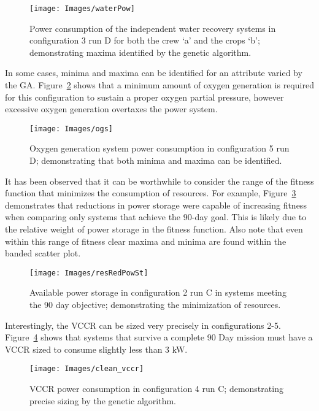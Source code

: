 \documentclass[submit]{aiaa}
\begin{document}
\begin{figure}[htb]
\texttt{[image: Images/waterPow]}
\caption{Power consumption of the independent water recovery systems in configuration 3
  run D for both the crew `a' and the crops `b'; demonstrating maxima identified by the genetic algorithm.}
\label{fig:waterRS}
\end{figure}

In some cases, minima and maxima can be identified for an attribute
varied by the GA. Figure~\ref{fig:ogsminmax} shows that a minimum
amount of oxygen generation is required for this configuration to
sustain a proper oxygen partial pressure, however excessive
oxygen generation overtaxes the power system.

\begin{figure}[htb]
\texttt{[image: Images/ogs]}
\caption{Oxygen generation system power consumption in configuration 5 run D; demonstrating that both minima and maxima can be identified.}
\label{fig:ogsminmax}
\end{figure}

It has been observed that it can be worthwhile to consider the range
of the fitness function that minimizes the consumption of
resources. 
For example, Figure~\ref{fig:resources} demonstrates that reductions in power storage were capable of increasing fitness when comparing only systems that achieve the 90-day goal.
This is likely due to the relative weight of power storage in the fitness function.
Also note that even within this range of fitness clear maxima and minima are found within the banded scatter plot.

\begin{figure}[htb]
\texttt{[image: Images/resRedPowSt]}
\caption{Available power storage in configuration 2 run C in systems meeting the 90 day objective; demonstrating the minimization of resources.}
\label{fig:resources}
\end{figure}

Interestingly, the VCCR can be sized very precisely in configurations
2-5. Figure~\ref{fig:nicevccr} shows that systems that survive a complete 90
Day mission must have a VCCR sized to consume slightly less than 3 kW.

\begin{figure}[htb]
\texttt{[image: Images/clean\_vccr]}
\caption{VCCR power consumption in configuration 4 run C; demonstrating precise sizing by the genetic algorithm.}
\label{fig:nicevccr}
\end{figure}
\end{document}
